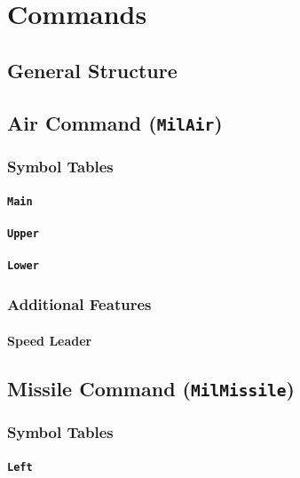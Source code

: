 \documentclass[a4paper, titlepage]{article}
\begin{document}
\section{Commands}

\subsection{General Structure}

\subsection{Air Command (\textbf{\texttt{MilAir}})}

\subsubsection{Symbol Tables}

\paragraph{\texttt{Main}}

\paragraph{\texttt{Upper}}

\paragraph{\texttt{Lower}}

\subsubsection{Additional Features}

\paragraph{Speed Leader}

\subsection{Missile Command (\textbf{\texttt{MilMissile}})}

\subsubsection{Symbol Tables}

\paragraph{\texttt{Left}}
\end{document}

